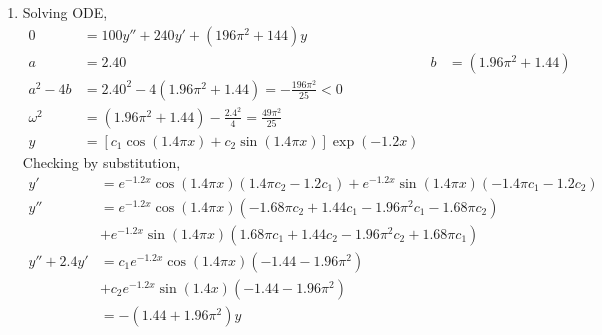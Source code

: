 \begin{enumerate}
    \item Solving ODE,
          \begin{align}
              0          & = 100y'' + 240y' + (196 \pi ^{2} + 144)y         \\
              a          & = 2.40                                         &
              b          & = (1.96 \pi ^{2} + 1.44)                         \\
              a^{2} - 4b & = 2.40^{2} - 4(1.96\pi ^{2} + 1.44) =
              - \frac{196 \pi^{2}}{25} < 0                                  \\
              \omega^{2} & = (1.96 \pi ^{2} + 1.44) - \frac{2.4^{2}}{4} =
              \frac{49 \pi^{2}}{25}                                         \\
              y          & = [c_{1}\cos(1.4\pi x) + c_{2}\sin(1.4\pi x)]
              \exp(-1.2x)
          \end{align}
          Checking by substitution,
          \begin{align}
              y'          & = e^{-1.2x}\cos(1.4\pi x) (1.4\pi c_{2} - 1.2c_{1})
              + e^{-1.2x}\sin(1.4\pi x)(-1.4\pi c_{1} - 1.2c_{2})                \\
              y''         & = e^{-1.2x}\cos(1.4\pi x)(-1.68\pi c_{2} + 1.44c_{1}
              - 1.96\pi^{2} c_{1} - 1.68\pi c_{2})                               \\
                          & + e^{-1.2x}\sin(1.4\pi x)(1.68\pi c_{1} + 1.44c_{2}
              - 1.96\pi^{2} c_{2} + 1.68 \pi c_{1})                              \\
              y'' + 2.4y' & = c_{1}e^{-1.2x}\cos(1.4\pi x)(-1.44 - 1.96\pi ^{2}) \\
                          & + c_{2}e^{-1.2x}\sin(1.4x)(-1.44 - 1.96\pi ^{2})     \\
                          & = -(1.44 + 1.96\pi ^{2})y
          \end{align}


\end{enumerate}
